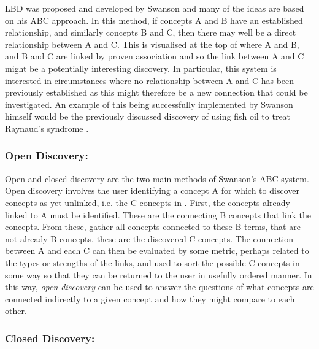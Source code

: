 \documentclass{l4proj}
\begin{document}
LBD was proposed and developed by Swanson \citep{smalheiser_rediscovering_2017} and many of the ideas are based on his ABC approach. In this method, if concepts A and B have an established relationship, and similarly concepts B and C, then there may well be a direct relationship between A and C. This is visualised at the top of  where A and B, and B and C are linked by proven association and so the link between A and C might be a potentially interesting discovery. In particular, this system is interested in circumstances where no relationship between A and C has been previously established as this might therefore be a new connection that could be investigated. An example of this being successfully implemented by Swanson himself would be the previously discussed discovery of using fish oil to treat Raynaud's syndrome \citep{swanson_fish_1986}. \\

\subsubsection{Open Discovery:}

Open and closed discovery are the two main methods of Swanson's ABC system. Open discovery involves the user identifying a concept A for which to discover concepts as yet unlinked, i.e. the C concepts in . First, the concepts already linked to A must be identified. These are the connecting B concepts that link the concepts. From these, gather all concepts connected to these B terms, that are not already B concepts, these are the discovered C concepts. The connection between A and each C can then be evaluated by some metric, perhaps related to the types or strengths of the links, and used to sort the possible C concepts in some way so that they can be returned to the user in usefully ordered manner. In this way, \textit{open discovery} can be used to answer the questions of what concepts are connected indirectly to a given concept and how they might compare to each other. \\

\subsubsection{Closed Discovery:}
\end{document}
